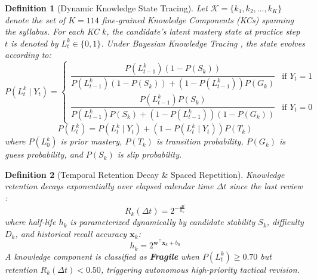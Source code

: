 \documentclass[conference]{IEEEtran}
\newtheorem{definition}{Definition}
\begin{document}
\begin{definition}[Dynamic Knowledge State Tracing]
Let $\mathcal{K} = \{k_1, k_2, \dots, k_K\}$ denote the set of $K = 114$ fine-grained Knowledge Components (KCs) spanning the syllabus. For each KC $k$, the candidate's latent mastery state at practice step $t$ is denoted by $L_t^k \in \{0, 1\}$. Under Bayesian Knowledge Tracing \cite{CorbettAnderson1995,BadrinathPardos2025}, the state evolves according to:
\begin{equation}
    P(L_t^k \mid Y_t) = \begin{cases} 
    \dfrac{P(L_{t-1}^k)(1 - P(S_k))}{P(L_{t-1}^k)(1 - P(S_k)) + (1 - P(L_{t-1}^k)) P(G_k)} & \text{if } Y_t = 1 \\ 
    \dfrac{P(L_{t-1}^k) P(S_k)}{P(L_{t-1}^k) P(S_k) + (1 - P(L_{t-1}^k))(1 - P(G_k))} & \text{if } Y_t = 0 
    \end{cases}
    \label{eq:bkt_posterior}
\end{equation}
\begin{equation}
    P(L_t^k) = P(L_t^k \mid Y_t) + \left(1 - P(L_t^k \mid Y_t)\right) P(T_k)
    \label{eq:bkt_transit}
\end{equation}
where $P(L_0^k)$ is prior mastery, $P(T_k)$ is transition probability, $P(G_k)$ is guess probability, and $P(S_k)$ is slip probability.
\end{definition}

\begin{definition}[Temporal Retention Decay \& Spaced Repetition]
Knowledge retention decays exponentially over elapsed calendar time $\Delta t$ since the last review \cite{SettlesMeeder2016,Wozniak1990}:
\begin{equation}
    R_k(\Delta t) = 2^{-\frac{\Delta t}{h_k}}
    \label{eq:hlr_decay}
\end{equation}
where half-life $h_k$ is parameterized dynamically by candidate stability $S_k$, difficulty $D_k$, and historical recall accuracy $\mathbf{x}_k$:
\begin{equation}
    h_k = 2^{\mathbf{w}^\top \mathbf{x}_k + b_0}
    \label{eq:hlr_halflife}
\end{equation}
A knowledge component is classified as \textbf{Fragile} when $P(L_t^k) \ge 0.70$ but retention $R_k(\Delta t) < 0.50$, triggering autonomous high-priority tactical revision.
\end{definition}
\end{document}
